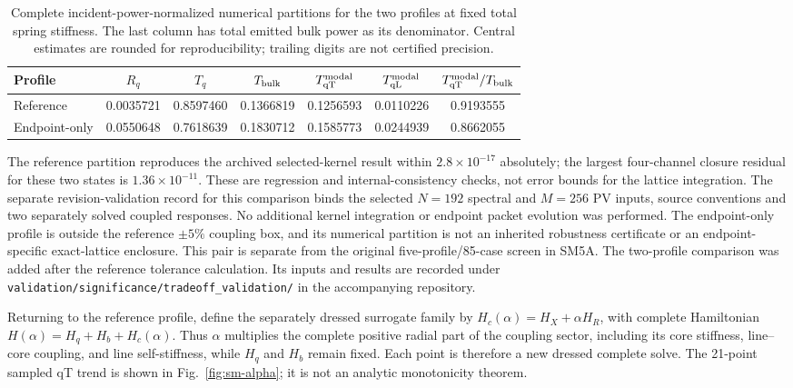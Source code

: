 \documentclass[10pt,aps,onecolumn,notitlepage,nofootinbib]{revtex4-2}
\newcommand{\qT}{\mathrm{qT}}
\newcommand{\qL}{\mathrm{qL}}
\begin{document}
\begin{table}[htbp]
 \squeezetable
 \caption{Complete incident-power-normalized numerical partitions for
 the two profiles at fixed total spring stiffness.  The last column has
 total emitted bulk power as its denominator.  Central estimates are
 rounded for reproducibility; trailing digits are not certified precision.}
 \label{tab:sm-equal-total}
 \begin{ruledtabular}
 \begin{tabular}{lcccccc}
 Profile & $R_q$ & $T_q$ & $T_{\rm bulk}$
 & $T_{\qT}^{\rm modal}$ & $T_{\qL}^{\rm modal}$
 & $T_{\qT}^{\rm modal}/T_{\rm bulk}$\\
 \hline
 Reference & 0.0035721 & 0.8597460 & 0.1366819
 & 0.1256593 & 0.0110226 & 0.9193555\\
 Endpoint-only & 0.0550648 & 0.7618639 & 0.1830712
 & 0.1585773 & 0.0244939 & 0.8662055\\
 \end{tabular}
 \end{ruledtabular}
\end{table}

The reference partition reproduces the archived selected-kernel result
within $2.8\times10^{-17}$ absolutely; the largest four-channel closure
residual for these two states is $1.36\times10^{-11}$.  These are
regression and internal-consistency checks, not error bounds for the
lattice integration.  The separate revision-validation record for this comparison binds the
selected $N=192$ spectral and $M=256$ PV inputs, source conventions and
two separately solved coupled responses.  No additional kernel integration
or endpoint packet evolution was performed.  The endpoint-only profile
is outside the reference $\pm5\%$ coupling box, and its numerical
partition is not an inherited robustness certificate or an
endpoint-specific exact-lattice enclosure.  This pair is separate from
the original five-profile/85-case screen in SM5A. The two-profile comparison was added after the reference tolerance calculation. Its inputs and results are recorded under \nolinkurl{validation/significance/tradeoff_validation/} in the accompanying repository.

Returning to the reference profile, define the separately dressed surrogate family by $H_c(\alpha)=H_X+\alpha H_R$, with complete Hamiltonian $H(\alpha)=H_q+H_b+H_c(\alpha)$. Thus $\alpha$ multiplies the complete positive radial part of the coupling sector, including its core stiffness, line--core coupling, and line self-stiffness, while $H_q$ and $H_b$ remain fixed. Each point is therefore a new dressed complete solve. The 21-point sampled qT trend is shown in Fig.~\ref{fig:sm-alpha}; it is not an analytic monotonicity theorem.
\end{document}
